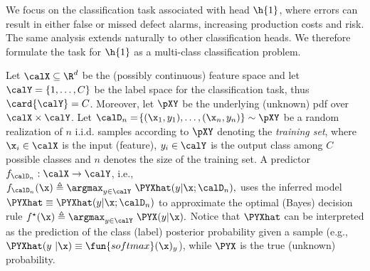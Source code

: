 We focus on the classification task associated with head \(\h{1}\), where errors can result in either false or missed defect alarms, increasing production costs and risk. The same analysis extends naturally to other classification heads. We therefore formulate the task for \(\h{1}\) as a multi-class classification problem.

Let \(\calX\subseteq\R^d\) be the (possibly continuous) feature space and let  \(\calY=\{1,\dots,C\}\) be the label space for the classification task, thus \(\card{\calY}=C\). Moreover, let \(\pXY\) be the underlying (unknown) \gls*{pdf} over \(\calX\times\calY\).
Let \(\calD_{n} = \!\left\{( \x_1, y_1),\dots,( \x_n, y_n)\right\}\sim \pXY\) be a random realization of $n$ i.i.d. samples according to \(\pXY\)  denoting the \textit{training set}, where \(\x_i \in \calX\) is the input (feature), \(y_i \in \calY\) is the output class among $C$ possible classes and $n$ denotes the size of the training set. A predictor \({f}_{\calD_{n}}: \calX\rightarrow\calY\), i.e.,
\(
f_{\calD_{n}}(\x) \triangleq \argmax_{y\in\calY}~\PYXhat(y|\x;\calD_{n}),
\)
uses the inferred model \(\PYXhat\equiv \PYXhat(y|\x;\calD_{n})\) to approximate the optimal (Bayes) decision rule
\(
f^\star(\x)  \triangleq   \argmax_{y\in\calY}~\PYX(y|\x).
\)
Notice that $\PYXhat$ can be interpreted as the prediction of the class (label) posterior probability given a sample (e.g., \(\PYXhat(y~|\x)\equiv \fun{softmax}(\mathbf{\x})_y\)), while \(\PYX\) is the true (unknown)  probability.

